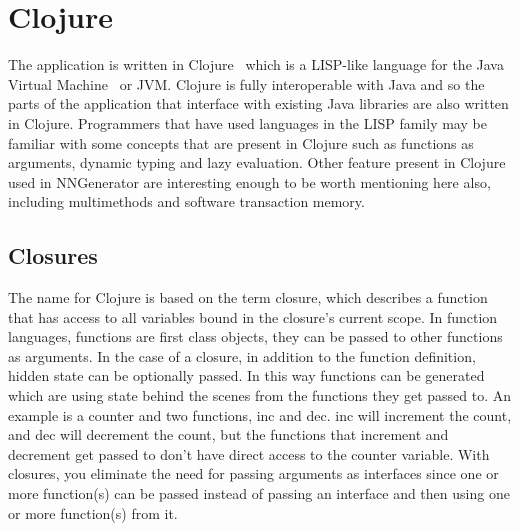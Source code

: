 \section{Clojure}
The application is written in Clojure~\cite{clj} which is a LISP-like language for the Java Virtual Machine~\cite{jvm} or JVM. Clojure is fully interoperable with Java and so the parts of the application that interface with existing Java libraries are also written in Clojure.
Programmers that have used languages in the LISP family may be familiar with some concepts that are present in Clojure such as functions as arguments, dynamic typing and lazy evaluation. Other feature present in Clojure used in NNGenerator are interesting enough to be worth mentioning here also, including multimethods and software transaction memory.

\subsection{Closures}
The name for Clojure is based on the term closure, which describes a function that has access to all variables bound in the closure's current scope. In function languages, functions are first class objects, they can be passed to other functions as arguments. In the case of a closure, in addition to the function definition, hidden state can be optionally passed. In this way functions can be generated which are using state behind the scenes from the functions they get passed to. An example is a counter and two functions, inc and dec. inc will increment the count, and dec will decrement the count, but the functions that increment and decrement get passed to don't have direct access to the counter variable. With closures, you eliminate the need for passing arguments as interfaces since one or more function(s) can be passed instead of passing an interface and then using one or more function(s) from it. 

